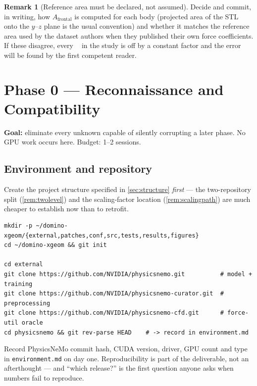 \documentclass[10pt,a4paper]{article}
\theoremstyle{definition}
\newtheorem{remark}{Remark}[section]
\DeclareMathOperator{\Cd}{C_d}
\begin{document}
\begin{remark}[Reference area must be declared, not assumed]
Decide and commit, in writing, how $A_{\text{frontal}}$ is computed for each body
(projected area of the STL onto the $y$--$z$ plane is the usual convention) and
whether it matches the reference area used by the dataset authors when they
published their own force coefficients. If these disagree, every $\Cd$ in the study
is off by a constant factor and the error will be found by the first competent
reader.
\end{remark}

\section{Phase 0 --- Reconnaissance and Compatibility}
\label{sec:phase0}

\textbf{Goal:} eliminate every unknown capable of silently corrupting a later
phase. No GPU work occurs here. Budget: 1--2 sessions.

\subsection{Environment and repository}

Create the project structure specified in \cref{sec:structure} \emph{first} --- the
two-repository split (\cref{rem:twolevel}) and the scaling-factor location
(\cref{rem:scalingpath}) are much cheaper to establish now than to retrofit.

\begin{lstlisting}[style=sh]
mkdir -p ~/domino-xgeom/{external,patches,conf,src,tests,results,figures}
cd ~/domino-xgeom && git init

cd external
git clone https://github.com/NVIDIA/physicsnemo.git          # model + training
git clone https://github.com/NVIDIA/physicsnemo-curator.git  # preprocessing
git clone https://github.com/NVIDIA/physicsnemo-cfd.git      # force-util oracle
cd physicsnemo && git rev-parse HEAD    # -> record in environment.md
\end{lstlisting}

Record PhysicsNeMo commit hash, CUDA version, driver, GPU count and type in
\texttt{environment.md} on day one. Reproducibility is part of the deliverable, not an
afterthought --- and ``which release?'' is the first question anyone asks when numbers
fail to reproduce.
\end{document}
